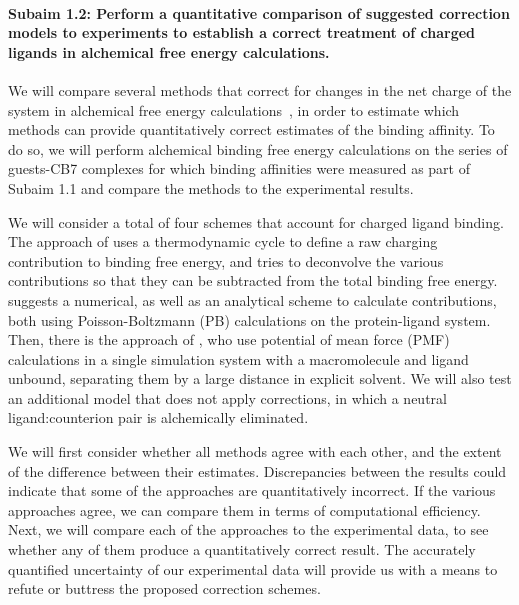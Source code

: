 \documentclass[10pt,final]{article}
\newcommand{\subsubsubsection}[1]{\paragraph*{#1}}
\begin{document}
\subsubsubsection{Subaim 1.2: Perform a quantitative comparison of suggested correction models to experiments to establish a correct treatment of charged ligands in alchemical free energy calculations.}
We will compare several methods that correct for changes in the net charge of the system in alchemical free energy calculations~\autocite{Reif2013a,Rocklin2013a, Lin2014a}, in order to estimate which methods can provide quantitatively correct estimates of the binding affinity.
%
To do so, we will perform alchemical binding free energy calculations on the series of guests-CB7 complexes for which binding affinities were measured as part of Subaim 1.1 and compare the methods to the experimental results.

We will consider a total of four schemes that account for charged ligand binding.
%
The approach of \textcite{Reif2013a} uses a thermodynamic cycle to define a raw charging contribution to binding free energy, and tries to deconvolve the various contributions so that they can be subtracted from the total binding free energy.
%
\textcite{Rocklin2013a} suggests a numerical, as well as an analytical scheme to calculate contributions, both using Poisson-Boltzmann (PB) calculations on the protein-ligand system.
%
Then, there is the approach of \textcite{Lin2014a}, who use potential of mean force (PMF) calculations in a single simulation system with a macromolecule and ligand unbound, separating them by a large distance in explicit solvent.
%
We will also test an additional model that does not apply corrections, in which a neutral ligand:counterion pair is alchemically eliminated. 


%
We will first consider whether all methods agree with each other, and the extent of the difference between their estimates.
%
Discrepancies between the results could indicate that some of the approaches are quantitatively incorrect.
%
If the various approaches agree, we can compare them in terms of computational efficiency.
%
Next, we will compare each of the approaches to the experimental data, to see whether any of them produce a quantitatively correct result.
%
The accurately quantified uncertainty of our experimental data will provide us with a means to refute or buttress the proposed correction schemes.
\end{document}
